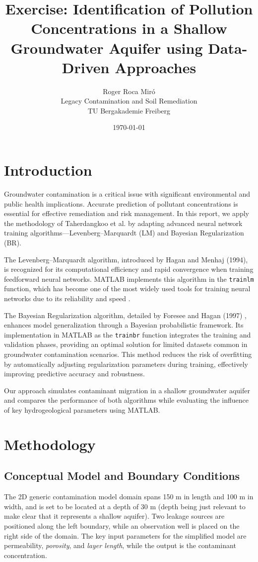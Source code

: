 \documentclass[10pt]{article}
\title{Exercise: Identification of Pollution Concentrations in a Shallow Groundwater Aquifer using Data-Driven Approaches}
\author{Roger Roca Miró \\ Legacy Contamination and Soil Remediation \\ TU Bergakademie Freiberg}
\date{\today}
\begin{document}
	
	\maketitle
	
	\section{Introduction}
	Groundwater contamination is a critical issue with significant environmental and public health implications. Accurate prediction of pollutant concentrations is essential for effective remediation and risk management. In this report, we apply the methodology of Taherdangkoo et al. \cite{taherdangkoo2020} by adapting advanced neural network training algorithms—Levenberg–Marquardt (LM) and Bayesian Regularization (BR).

	The Levenberg–Marquardt algorithm, introduced by Hagan and Menhaj (1994), is recognized for its computational efficiency and rapid convergence when training feedforward neural networks. MATLAB implements this algorithm in the \texttt{trainlm} function, which has become one of the most widely used tools for training neural networks due to its reliability and speed \cite{hagan1994,matlab}.

	The Bayesian Regularization algorithm, detailed by Foresee and Hagan (1997) \cite{foresee1997,matlab}, enhances model generalization through a Bayesian probabilistic framework. Its implementation in MATLAB as the \texttt{trainbr} function integrates the training and validation phases, providing an optimal solution for limited datasets common in groundwater contamination scenarios. This method reduces the risk of overfitting by automatically adjusting regularization parameters during training, effectively improving predictive accuracy and robustness.

	Our approach simulates contaminant migration in a shallow groundwater aquifer and compares the performance of both algorithms while evaluating the influence of key hydrogeological parameters using MATLAB.
	
	\section{Methodology}
	\subsection{Conceptual Model and Boundary Conditions}
	The 2D generic contamination model domain spans 150 m in length and 100 m in width, and is set to be located at a depth of 30 m (depth being just relevant to make clear that it represents a shallow aquifer). Two leakage sources are positioned along the left boundary, while an observation well is placed on the right side of the domain. The key input parameters for the simplified model are permeability, \textit{porosity}, and \textit{layer length}, while the output is the contaminant concentration.
	
\end{document}
